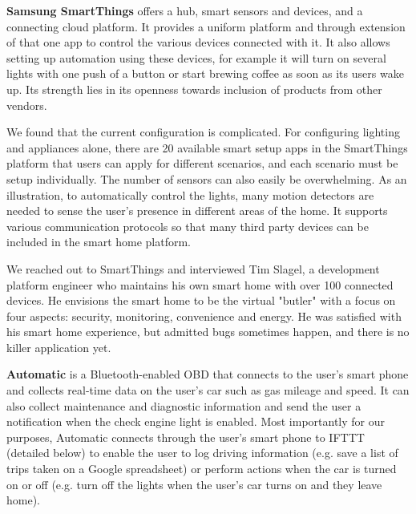
\textbf{Samsung SmartThings} offers a hub, smart sensors and devices, and a connecting cloud platform. It provides a uniform platform and through extension of that one app to control the various devices connected with it. It also allows setting up automation using these devices, for example it will turn on several lights with one push of a button or start brewing coffee as soon as its users wake up. Its strength lies in its openness towards inclusion of products from other vendors. 

We found that the current configuration is complicated. For configuring lighting and appliances alone, there are 20 available smart setup apps in the SmartThings platform that users can apply for different scenarios, and each scenario must be setup individually. The number of sensors can also easily be overwhelming. As an illustration, to automatically control the lights, many motion detectors are needed to sense the user's presence in different areas of the home. It supports various communication protocols so that many third party devices can be included in the smart home platform.

We  reached out to SmartThings and interviewed Tim Slagel, a development platform engineer who maintains his own smart home with over 100 connected devices. He envisions the smart home to be the virtual "butler" with a focus on four aspects: security, monitoring, convenience  and energy. He was satisfied with his smart home experience, but admitted bugs sometimes happen, and there is no killer application yet.

\textbf{Automatic} is a Bluetooth-enabled OBD that connects to the user's smart phone and collects real-time data on the user's car such as gas mileage and speed. It can also collect maintenance and diagnostic information and send the user a notification when the check engine light is enabled. Most importantly for our purposes, Automatic connects through the user's smart phone to IFTTT (detailed below) to enable the user to log driving information (e.g. save a list of trips taken on a Google spreadsheet) or perform actions when the car is turned on or off (e.g. turn off the lights when the user's car turns on and they leave home).

